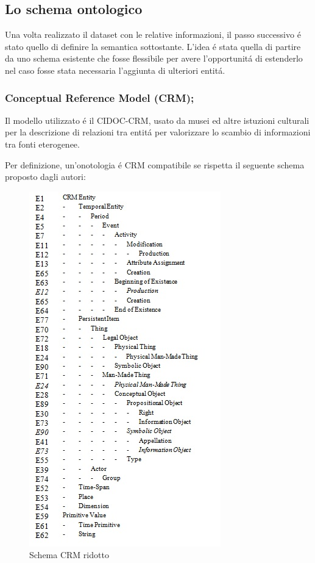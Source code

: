 \documentclass[11pt,a4paper]{article}
\begin{document}





\subsection{Lo schema ontologico}
Una volta realizzato il dataset con le relative informazioni, il passo successivo \'e stato quello di definire la semantica sottostante. L'idea \'e stata quella di partire da uno schema esistente che fosse flessibile per avere l'opportunit\'a di estenderlo nel caso fosse stata necessaria l'aggiunta di ulteriori entit\'a.

\subsubsection{Conceptual Reference Model (CRM);}
Il modello utilizzato \'e il CIDOC-CRM, usato da musei ed altre istuzioni culturali per la descrizione di relazioni tra entit\'a per valorizzare lo scambio di informazioni tra fonti eterogenee.
 
Per definizione, un'onotologia \'e CRM compatibile se rispetta il seguente schema proposto dagli autori:

\begin{figure}[htbp]
	\centering
	\includegraphics[scale=0.75]{immaginiTesina/ridotto.jpg}
	\caption{Schema CRM ridotto}
	\centering
\end{figure}
\end{document}
